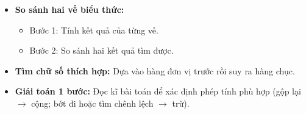 \documentclass[11pt,a4paper]{article}
\begin{document}
\begin{minipage}[t]{0.49\textwidth}\vspace{0pt}
\begin{tcolorbox}[
  enhanced,
  colback=teal!4!white,
  colframe=teal!75!black,
  arc=2mm, boxrule=0.8pt,
  left=2mm, right=2mm, top=1.8mm, bottom=1.8mm,
  title={\footnotesize\bfseries\color{white}\faSliders\ 2. Kĩ năng tổng hợp}
]
{\footnotesize
\begin{itemize}\setlength{\itemsep}{1pt}\setlength{\leftskip}{-2.5mm}
  \item \textbf{So sánh hai vế biểu thức:}
  \begin{itemize}\setlength{\itemsep}{0.5pt}\setlength{\leftskip}{-2.5mm}
    \item Bước 1: Tính kết quả của từng vế.
    \item Bước 2: So sánh hai kết quả tìm được.
  \end{itemize}
  \item \textbf{Tìm chữ số thích hợp:} Dựa vào hàng đơn vị trước rồi suy ra hàng chục.
  \item \textbf{Giải toán 1 bước:} Đọc kĩ bài toán để xác định phép tính phù hợp (gộp lại $\to$ cộng; bớt đi hoặc tìm chênh lệch $\to$ trừ).
\end{itemize}
}
\end{tcolorbox}
\end{minipage}
\end{document}
